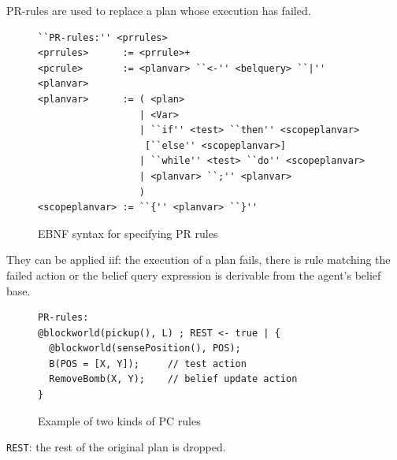 \documentclass[a4paper]{article}
\begin{document}
PR-rules are used to replace a plan whose execution has failed.

\begin{figure}[htp]
\begin{verbatim}
``PR-rules:'' <prrules>
<prrules>      := <prrule>+
<pcrule>       := <planvar> ``<-'' <belquery> ``|'' <planvar>
<planvar>      := ( <plan>
                  | <Var>
                  | ``if'' <test> ``then'' <scopeplanvar>
                   [``else'' <scopeplanvar>]
                  | ``while'' <test> ``do'' <scopeplanvar> 
                  | <planvar> ``;'' <planvar>
                  )
<scopeplanvar> := ``{'' <planvar> ``}''
\end{verbatim}
\caption{EBNF syntax for specifying PR rules}
\label{fig:ebnf_prrules}
\end{figure}

They can be applied iif: the execution of a plan fails, there is rule matching the failed action or the belief query expression is derivable from the agent's belief base.

\begin{figure}[htp]
\begin{verbatim}
PR-rules:
@blockworld(pickup(), L) ; REST <- true | { 
  @blockworld(sensePosition(), POS);
  B(POS = [X, Y]);     // test action	
  RemoveBomb(X, Y);    // belief update action
}
\end{verbatim}
\caption{Example of two kinds of PC rules}
\label{fig:example_pcrules}
\end{figure}

\texttt{REST}: the rest of the original plan is dropped.
\end{document}
